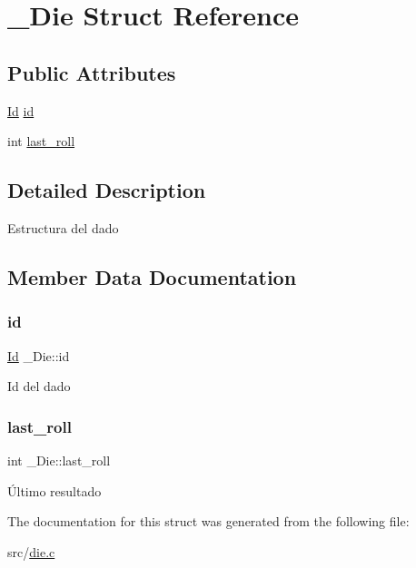 \hypertarget{struct__Die}{}\section{\+\_\+\+Die Struct Reference}
\label{struct__Die}
\subsection*{Public Attributes}
\begin{DoxyCompactItemize}
\item 
\hyperlink{types_8h_a845e604fb28f7e3d97549da3448149d3}{Id} \hyperlink{struct__Die_a0887af562dda760409957f13619d36f1}{id}
\item 
int \hyperlink{struct__Die_a522e4527bd70cf87afcbabd9d9dede34}{last\+\_\+roll}
\end{DoxyCompactItemize}


\subsection{Detailed Description}
Estructura del dado 

\subsection{Member Data Documentation}
\mbox{\label{struct__Die_a0887af562dda760409957f13619d36f1}} 
\subsubsection{\texorpdfstring{id}{id}}
{\footnotesize\ttfamily \hyperlink{types_8h_a845e604fb28f7e3d97549da3448149d3}{Id} \+\_\+\+Die\+::id}

Id del dado \mbox{\label{struct__Die_a522e4527bd70cf87afcbabd9d9dede34}} 
\subsubsection{\texorpdfstring{last\+\_\+roll}{last\_roll}}
{\footnotesize\ttfamily int \+\_\+\+Die\+::last\+\_\+roll}

Último resultado 

The documentation for this struct was generated from the following file\+:\begin{DoxyCompactItemize}
\item 
src/\hyperlink{die_8c}{die.\+c}\end{DoxyCompactItemize}

